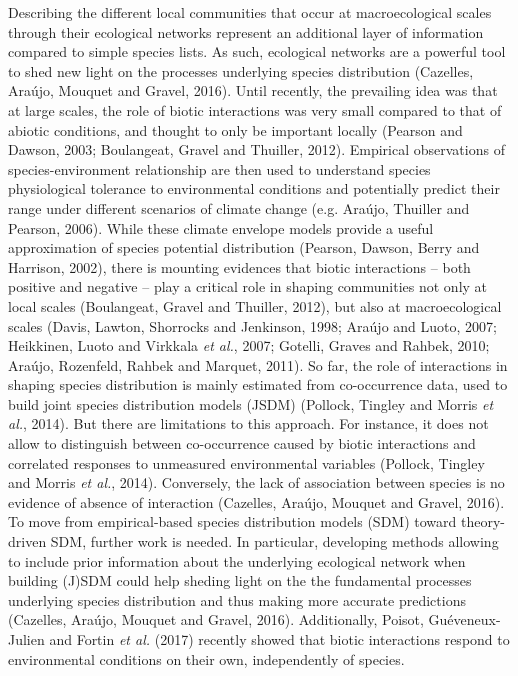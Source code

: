 \documentclass[12pt]{article}
\begin{document}
Describing the different local communities that occur at macroecological
scales through their ecological networks represent an additional layer
of information compared to simple species lists. As such, ecological
networks are a powerful tool to shed new light on the processes
underlying species distribution (Cazelles, Araújo, Mouquet and Gravel,
2016). Until recently, the prevailing idea was that at large scales, the
role of biotic interactions was very small compared to that of abiotic
conditions, and thought to only be important locally (Pearson and
Dawson, 2003; Boulangeat, Gravel and Thuiller, 2012). Empirical
observations of species-environment relationship are then used to
understand species physiological tolerance to environmental conditions
and potentially predict their range under different scenarios of climate
change (e.g. Araújo, Thuiller and Pearson, 2006). While these climate
envelope models provide a useful approximation of species potential
distribution (Pearson, Dawson, Berry and Harrison, 2002), there is
mounting evidences that biotic interactions -- both positive and
negative -- play a critical role in shaping communities not only at
local scales (Boulangeat, Gravel and Thuiller, 2012), but also at
macroecological scales (Davis, Lawton, Shorrocks and Jenkinson, 1998;
Araújo and Luoto, 2007; Heikkinen, Luoto and Virkkala \emph{et al.},
2007; Gotelli, Graves and Rahbek, 2010; Araújo, Rozenfeld, Rahbek and
Marquet, 2011). So far, the role of interactions in shaping species
distribution is mainly estimated from co-occurrence data, used to build
joint species distribution models (JSDM) (Pollock, Tingley and Morris
\emph{et al.}, 2014). But there are limitations to this approach. For
instance, it does not allow to distinguish between co-occurrence caused
by biotic interactions and correlated responses to unmeasured
environmental variables (Pollock, Tingley and Morris \emph{et al.},
2014). Conversely, the lack of association between species is no
evidence of absence of interaction (Cazelles, Araújo, Mouquet and
Gravel, 2016). To move from empirical-based species distribution models
(SDM) toward theory-driven SDM, further work is needed. In particular,
developing methods allowing to include prior information about the
underlying ecological network when building (J)SDM could help sheding
light on the the fundamental processes underlying species distribution
and thus making more accurate predictions (Cazelles, Araújo, Mouquet and
Gravel, 2016). Additionally, Poisot, Guéveneux-Julien and Fortin
\emph{et al.} (2017) recently showed that biotic interactions respond to
environmental conditions on their own, independently of species.
\end{document}
